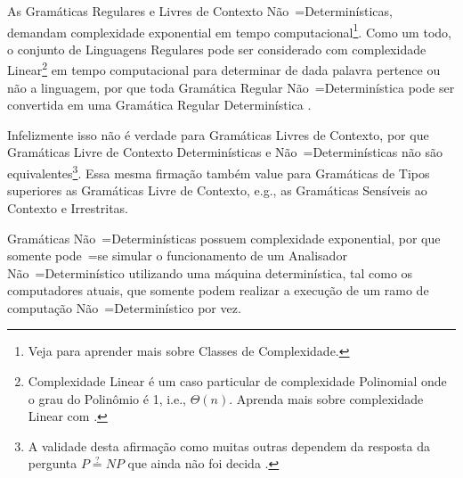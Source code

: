 {    As Gramáticas Regulares e
    Livres de Contexto Não~=Determinísticas,
    demandam complexidade exponential em tempo computacional\footnote{
    Veja  para aprender mais sobre Classes de Complexidade.
    }.
    Como um todo,
    o conjunto de Linguagens Regulares pode ser considerado com complexidade Linear\footnote{
    Complexidade Linear é um caso particular de complexidade Polinomial onde o grau do Polinômio é 1, i.e., $\Theta(n)$.
    Aprenda mais sobre complexidade Linear com .
    } em tempo computacional para determinar de dada palavra pertence ou
    não a linguagem,
    por que toda Gramática Regular Não~=Determinística pode ser convertida em uma Gramática Regular Determinística \cite{sipserBook}.

    Infelizmente isso não é verdade para Gramáticas Livres de Contexto,
    por que Gramáticas Livre de Contexto Determinísticas e
    Não~=Determinísticas não são equivalentes\footnote{
    A validade desta afirmação como muitas outras dependem da resposta da pergunta $P \stackrel{?}{=} NP$ que ainda não foi decida \cite{computationalComplexityAuroraBarak}.
    }.
    Essa mesma firmação também value para Gramáticas de Tipos superiores as Gramáticas Livre de Contexto,
    e.g.,
    as Gramáticas Sensíveis ao Contexto e
    Irrestritas.

    Gramáticas Não~=Determinísticas possuem complexidade exponential,
    por que somente pode~=se simular o funcionamento de um Analisador Não~=Determinístico utilizando uma máquina determinística,
    tal como os computadores atuais,
    que somente podem realizar a execução de um ramo de computação Não~=Determinístico por vez.

}
